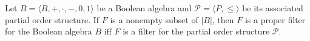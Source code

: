 Let $B = \langle B, +, \cdot, -, 0, 1 \rangle$ be a Boolean algebra and $\mathcal{P} = \langle P, \leq \rangle$ be its associated partial order structure. If $F$ is a nonempty subset of $|B|$, then $F$ is a proper filter for the Boolean algebra $B$ iff $F$ is a filter for the partial order structure $\mathcal{P}$.

